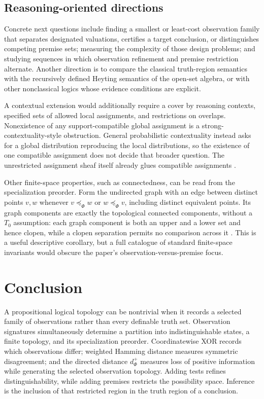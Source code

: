\documentclass[11pt]{article}
\theoremstyle{definition}
\theoremstyle{plain}
\theoremstyle{remark}
\begin{document}
\subsection{Reasoning-oriented directions}

Concrete next questions include finding a smallest or least-cost observation
family that separates designated valuations, certifies a target conclusion, or
distinguishes competing premise sets; measuring the complexity of those design
problems; and studying sequences in which observation refinement and premise
restriction alternate.  Another direction is to compare the classical
truth-region semantics with the recursively defined Heyting semantics of the
open-set algebra, or with other nonclassical logics whose evidence conditions
are explicit.

A contextual extension would additionally require a cover by reasoning
contexts, specified sets of allowed local assignments, and restrictions on
overlaps.  Nonexistence of any support-compatible global assignment is a
strong-contextuality-style obstruction.  General probabilistic contextuality
instead asks for a global distribution reproducing the local distributions, so
the existence of one compatible assignment does not decide that broader
question.  The unrestricted assignment sheaf itself already glues compatible
assignments \cite[Sec.~6]{AbramskyBrandenburger2011}.

Other finite-space properties, such as connectedness, can be read from the
specialization preorder.  Form the undirected graph with an edge between
distinct points $v,w$ whenever $v\preceq_\Phi w$ or $w\preceq_\Phi v$, including
distinct equivalent points.  Its graph components are exactly the topological
connected components, without a $T_0$ assumption: each graph component is both
an upper and a lower set and hence clopen, while a clopen separation permits no
comparison across it \cite[Prop.~5]{Stong1966}.  This is a useful descriptive
corollary, but a full catalogue of standard finite-space invariants would obscure the paper's
observation-versus-premise focus.

\section{Conclusion}

A propositional logical topology can be nontrivial when it records a selected
family of observations rather than every definable truth set.  Observation
signatures simultaneously determine a partition into indistinguishable states,
a finite topology, and its specialization preorder.  Coordinatewise XOR records
which observations differ; weighted Hamming distance measures symmetric
disagreement; and the directed distance $d_\Phi^+$ measures loss of positive
information while generating the selected observation topology.  Adding tests
refines distinguishability, while adding premises restricts the possibility
space.  Inference is the inclusion of that restricted region in the truth
region of a conclusion.
\end{document}
